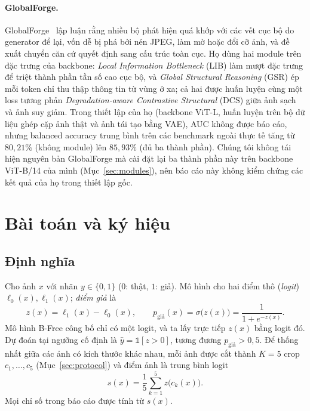 \documentclass[11pt,a4paper]{article}
\begin{document}
\paragraph{GlobalForge.} GlobalForge~\cite{cui2026globalforge} lập luận rằng nhiều bộ phát hiện quá khớp với các vết cục bộ do generator để lại, vốn dễ bị phá bởi nén JPEG, làm mờ hoặc đổi cỡ ảnh, và đề xuất chuyển căn cứ quyết định sang cấu trúc toàn cục. Họ dùng hai module trên đặc trưng của backbone: \emph{Local Information Bottleneck} (LIB) làm mượt đặc trưng để triệt thành phần tần số cao cục bộ, và \emph{Global Structural Reasoning} (GSR) ép mỗi token chỉ thu thập thông tin từ vùng ở xa; cả hai được huấn luyện cùng một loss tương phản \emph{Degradation-aware Contrastive Structural} (DCS) giữa ảnh sạch và ảnh suy giảm. Trong thiết lập của họ (backbone ViT-L, huấn luyện trên bộ dữ liệu ghép cặp ảnh thật và ảnh tái tạo bằng VAE), AUC không được báo cáo, nhưng balanced accuracy trung bình trên các benchmark ngoài thực tế tăng từ $80{,}21\%$ (không module) lên $85{,}93\%$ (đủ ba thành phần). Chúng tôi không tái hiện nguyên bản GlobalForge mà cài đặt lại ba thành phần này trên backbone ViT-B/14 của mình (Mục~\ref{sec:modules}), nên báo cáo này không kiểm chứng các kết quả của họ trong thiết lập gốc.

\section{Bài toán và ký hiệu}\label{sec:problem}

\subsection{Định nghĩa}
Cho ảnh $x$ với nhãn $y\in\{0,1\}$ ($0$: thật, $1$: giả). Mô hình cho hai điểm thô (\emph{logit}) $\ell_0(x),\ell_1(x)$; \emph{điểm giả} là
\begin{equation}
\label{eq:score}
z(x)=\ell_1(x)-\ell_0(x),\qquad p_{\text{giả}}(x)=\sigma\big(z(x)\big)=\frac{1}{1+e^{-z(x)}}.
\end{equation}
Mô hình B-Free công bố chỉ có một logit, và ta lấy trực tiếp $z(x)$ bằng logit đó. Dự đoán tại ngưỡng cố định là $\hat y=\mathbb{1}[z>0]$, tương đương $p_{\text{giả}}>0{,}5$. Để thống nhất giữa các ảnh có kích thước khác nhau, mỗi ảnh được cắt thành $K=5$ crop $c_1,\dots,c_5$ (Mục~\ref{sec:protocol}) và điểm ảnh là trung bình logit
\begin{equation}
\label{eq:meanlogit}
s(x)=\frac{1}{5}\sum_{k=1}^{5} z\big(c_k(x)\big).
\end{equation}
Mọi chỉ số trong báo cáo được tính từ $s(x)$.
\end{document}
